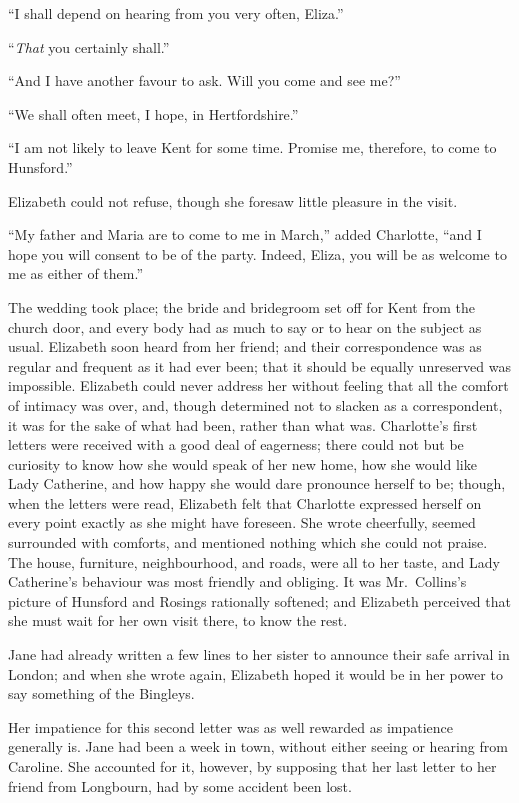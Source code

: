 “I shall depend on hearing from you very often,
Eliza.”

“\textit{That} you certainly shall.”

“And I have another favour to ask. Will you come
and see me?”

“We shall often meet, I hope, in Hertfordshire.”

“I am not likely to leave Kent for some time. Promise
me, therefore, to come to Hunsford.”

Elizabeth could not refuse, though she foresaw little
pleasure in the visit.

“My father and Maria are to come to me in March,”
added Charlotte, “and I hope you will consent to be of
the party. Indeed, Eliza, you will be as welcome to me
as either of them.”

The wedding took place; the bride and bridegroom set
off for Kent from the church door, and every body had
as much to say or to hear on the subject as usual. Elizabeth
soon heard from her friend; and their correspondence
was as regular and frequent as it had ever been;
that it should be equally unreserved was impossible.
Elizabeth could never address her without feeling that
all the comfort of intimacy was over, and, though
determined not to slacken as a correspondent, it was for
the sake of what had been, rather than what was. Charlotte’s
first letters were received with a good deal of
eagerness; there could not but be curiosity to know how
she would speak of her new home, how she would like
Lady Catherine, and how happy she would dare pronounce
herself to be; though, when the letters were read, Elizabeth
felt that Charlotte expressed herself on every point
exactly as she might have foreseen. She wrote cheerfully,
seemed surrounded with comforts, and mentioned nothing
which she could not praise. The house, furniture, neighbourhood,
and roads, were all to her taste, and Lady
Catherine’s behaviour was most friendly and obliging.
It was Mr.\ Collins’s picture of Hunsford and Rosings
rationally softened; and Elizabeth perceived that she
must wait for her own visit there, to know the rest.

Jane had already written a few lines to her sister to
announce their safe arrival in London; and when she
wrote again, Elizabeth hoped it would be in her power
to say something of the Bingleys.

Her impatience for this second letter was as well
rewarded as impatience generally is. Jane had been a week
in town, without either seeing or hearing from Caroline.
She accounted for it, however, by supposing that her last
letter to her friend from Longbourn, had by some accident
been lost.

